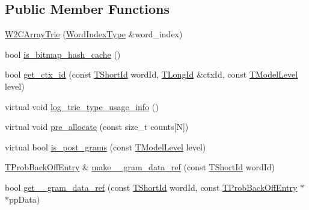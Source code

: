 \subsection*{Public Member Functions}
\begin{DoxyCompactItemize}
\item 
\hyperlink{classuva_1_1smt_1_1tries_1_1_w2_c_array_trie_aec1fb54eb8d11e4e5d1f35f7f0662a28}{W2\+C\+Array\+Trie} (\hyperlink{classuva_1_1smt_1_1tries_1_1_word_index_trie_base_a30c4fffe3a3423c87b229b66340dd2f8}{Word\+Index\+Type} \&word\+\_\+index)
\item 
bool \hyperlink{classuva_1_1smt_1_1tries_1_1_w2_c_array_trie_a6fd39f686ecf6225c537fdb626a0f0f9}{is\+\_\+bitmap\+\_\+hash\+\_\+cache} ()
\item 
bool \hyperlink{classuva_1_1smt_1_1tries_1_1_w2_c_array_trie_a6d0bda1cd5bfebeb38fd199f73f0c65a}{get\+\_\+ctx\+\_\+id} (const \hyperlink{namespaceuva_1_1smt_1_1hashing_adcf22e1982ad09d3a63494c006267469}{T\+Short\+Id} word\+Id, \hyperlink{namespaceuva_1_1smt_1_1hashing_a5992ac0dea0fb3226fb403ede09fad55}{T\+Long\+Id} \&ctx\+Id, const \hyperlink{namespaceuva_1_1smt_1_1tries_a20577a44b3a42d26524250634379b7cb}{T\+Model\+Level} level)
\item 
virtual void \hyperlink{classuva_1_1smt_1_1tries_1_1_w2_c_array_trie_a65ffb8091b67ca24c6e444c7e5e058e3}{log\+\_\+trie\+\_\+type\+\_\+usage\+\_\+info} ()
\item 
virtual void \hyperlink{classuva_1_1smt_1_1tries_1_1_w2_c_array_trie_a9bbaa67b3baf4e1b87147bbdd9516cdf}{pre\+\_\+allocate} (const size\+\_\+t counts\mbox{[}N\mbox{]})
\item 
virtual bool \hyperlink{classuva_1_1smt_1_1tries_1_1_w2_c_array_trie_a7704fb5795b2cfe2158fce4d1424fcbe}{is\+\_\+post\+\_\+grams} (const \hyperlink{namespaceuva_1_1smt_1_1tries_a20577a44b3a42d26524250634379b7cb}{T\+Model\+Level} level)
\item 
\hyperlink{structuva_1_1smt_1_1tries_1_1_t_prob_back_off_entry}{T\+Prob\+Back\+Off\+Entry} \& \hyperlink{classuva_1_1smt_1_1tries_1_1_w2_c_array_trie_a3dd3270d1c822950c2106dbd65385244}{make\+\_\+\_\+gram\+\_\+data\+\_\+ref} (const \hyperlink{namespaceuva_1_1smt_1_1hashing_adcf22e1982ad09d3a63494c006267469}{T\+Short\+Id} word\+Id)
\item 
bool \hyperlink{classuva_1_1smt_1_1tries_1_1_w2_c_array_trie_aaa27237c1c64743ccff1a0154a328ef4}{get\+\_\+\_\+gram\+\_\+data\+\_\+ref} (const \hyperlink{namespaceuva_1_1smt_1_1hashing_adcf22e1982ad09d3a63494c006267469}{T\+Short\+Id} word\+Id, const \hyperlink{structuva_1_1smt_1_1tries_1_1_t_prob_back_off_entry}{T\+Prob\+Back\+Off\+Entry} $\ast$$\ast$pp\+Data)
$$
\end{DoxyCompactItemize}
